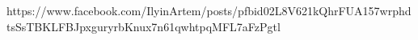  
 
 
 
 

https://www.facebook.com/IlyinArtem/posts/pfbid02L8V621kQhrFUA157wrphdtsSsTBKLFBJpxguryrbKnux7n61qwhtpqMFL7aFzPgtl
